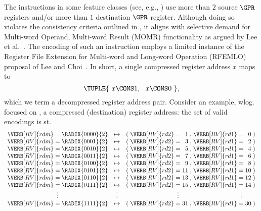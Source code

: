 The instructions in some feature classes
(see, e.g., )
use 
more than $2$ source      $\GPR$ registers
and/or
more than $1$ destination $\GPR$ register.
Although doing so violates the consistency criteria outlined in 
,
it aligns with selective demand for 
Multi-word Operand, Multi-word Result (MOMR) 
functionality as argued by
Lee et al.~\cite{SCARV:LeeYanShi:04}.
The encoding of such an instruction employs a limited instance of the
Register File Extension for Multi-word and Long-word Operation (RFEMLO)
proposal of 
Lee and Choi~\cite{SCARV:LeeCho:08}.
In short, a single compressed register address $x$ maps to
\[
\TUPLE{ ~ x \CONS 1, ~~ x \CONS 0 ~ } ,
\]
which we term a 
decompressed register address pair.  Consider an example, wlog. focused
on , a compressed (destination) register address: the set 
of valid encodings is st.
\[
\begin{array}{l@{\;}c@{\;}r c c@{\;}l@{\;}c@{\;}r@{\;}c@{\;}l@{\;}c@{\;}r@{\;}c}
\VERB[RV]{rdm} &=     & \RADIX{0000}{2} &\mapsto& ( & \VERB[RV]{rd2} &=     &  1 &,& \VERB[RV]{rd1} &=     &  0 & ) \\
\VERB[RV]{rdm} &=     & \RADIX{0001}{2} &\mapsto& ( & \VERB[RV]{rd2} &=     &  3 &,& \VERB[RV]{rd1} &=     &  2 & ) \\
\VERB[RV]{rdm} &=     & \RADIX{0010}{2} &\mapsto& ( & \VERB[RV]{rd2} &=     &  5 &,& \VERB[RV]{rd1} &=     &  4 & ) \\
\VERB[RV]{rdm} &=     & \RADIX{0011}{2} &\mapsto& ( & \VERB[RV]{rd2} &=     &  7 &,& \VERB[RV]{rd1} &=     &  6 & ) \\
\VERB[RV]{rdm} &=     & \RADIX{0100}{2} &\mapsto& ( & \VERB[RV]{rd2} &=     &  9 &,& \VERB[RV]{rd1} &=     &  8 & ) \\
\VERB[RV]{rdm} &=     & \RADIX{0101}{2} &\mapsto& ( & \VERB[RV]{rd2} &=     & 11 &,& \VERB[RV]{rd1} &=     & 10 & ) \\
\VERB[RV]{rdm} &=     & \RADIX{0110}{2} &\mapsto& ( & \VERB[RV]{rd2} &=     & 13 &,& \VERB[RV]{rd1} &=     & 12 & ) \\
\VERB[RV]{rdm} &=     & \RADIX{0111}{2} &\mapsto& ( & \VERB[RV]{rd2} &=     & 15 &,& \VERB[RV]{rd1} &=     & 14 & ) \\
               &\vdots&                 &\vdots &   &                &\vdots&    & &                &\vdots&    &   \\
\VERB[RV]{rdm} &=     & \RADIX{1111}{2} &\mapsto& ( & \VERB[RV]{rd2} &=     & 31 &,& \VERB[RV]{rd1} &=     & 30 & ) \\
\end{array}
\]
